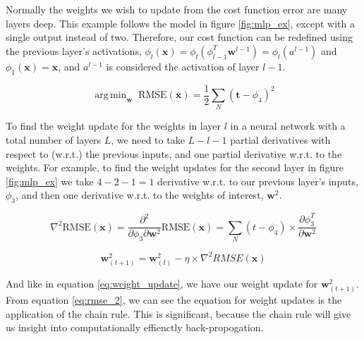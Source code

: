 \message{ !name(main.tex)}\documentclass[11pt]{article}
\DeclareMathOperator*{\argmin}{arg\,min}
\begin{document}
Normally the weights we wish to update from the cost function error are many layers deep. This example follows the model in figure \ref{fig:mlp_ex}, except with a single output instead of two. Therefore, our cost function can be redefined using the previous layer's activations, $\phi_{l}(\mathbf{x}) = \phi_{l}\left(\phi_{l-1}^{T}\mathbf{w}^{l-1}\right) = \phi_{l}\left(a^{l-1}\right)$ and $\phi_{1}(\mathbf{x}) = \mathbf{x}$, and $a^{l-1}$ is considered the activation of layer $l-1$. 

\begin{equation}
    \argmin_{\mathbf{w}} \;\mathrm{RMSE}(\mathbf{x}) = \frac{1}{2}\sum_{N} \left(\mathbf{t} - \phi_{4}\right)^{2}
\end{equation}


\par
To find the weight update for the weights in layer $l$ in a neural network with a total number of layers $L$, we need to take $L - l - 1$ partial derivatives with respect to (w.r.t.) the previous inputs, and one partial derivative w.r.t. to the weights. 
For example, to find the weight updates for the second layer in figure \ref{fig:mlp_ex} we take $4 - 2 - 1 = 1$ derivative w.r.t. to our previous layer's inputs, $\phi_{3}$, and then one derivative w.r.t. to the weights of interest, $\mathbf{w}^{2}$.

\begin{equation}\label{eq:rmse_2}
  \nabla^{2}\mathrm{RMSE}(\mathbf{x}) = \frac{\partial^{2}}{\partial \phi_{3} \partial \mathbf{w}^{2}}\mathrm{RMSE}(\mathbf{x}) = \sum_{N}\left(t - \phi_{4}\right) \times \frac{\partial \phi^{T}_{3}}{\partial \mathbf{w}^{2}}
\end{equation}


\[
  \mathbf{w}_{(t+1)}^{2} = \mathbf{w}_{(t)}^{2} - \eta \times \nabla^{2} RMSE(\mathbf{x})
\]

And like in equation \ref{eq:weight_update}, we have our weight update for $\mathbf{w}^{2}_{(t+1)}$. From equation \ref{eq:rmse_2}, we can see the equation for weight updates is the application of the chain rule. This is significant, because the chain rule will give us insight into computationally effienctly back-propogation.

\newcommand\xbase{-3.95}
\newcommand\ybase{0.7}
\newcommand\hibox{1.2}
\newcommand\wibox{0.88}
\newcommand\tbdis{3.34}
\newcommand\bbdis{3.34}
\newcommand\ybshift{-1.275}
\newcommand\xbshift{-0.45}
\newcommand\xobshift{1.35}
\newcommand\xotshift{1.85}
\end{document}
